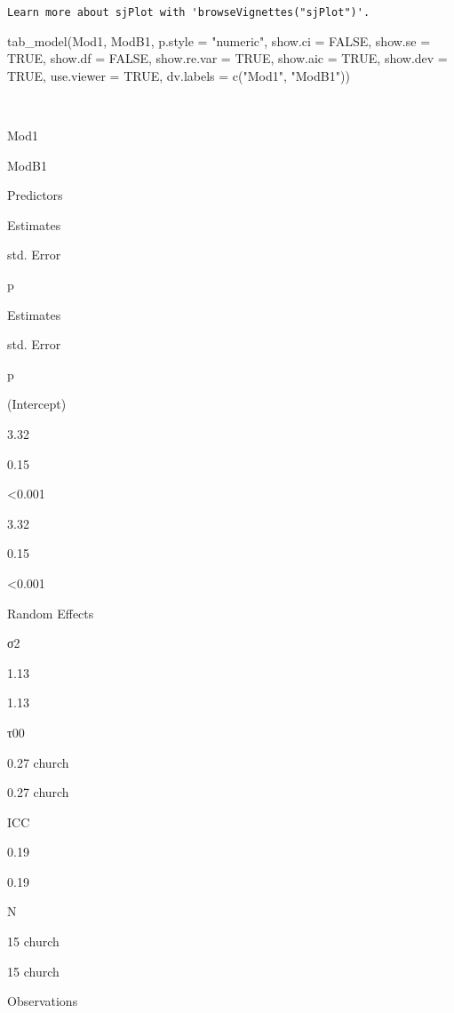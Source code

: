 \documentclass[
  11pt,
]{book}
\newenvironment{Shaded}{\begin{snugshade}}{\end{snugshade}}
\newcommand{\AttributeTok}[1]{\textcolor[rgb]{0.77,0.63,0.00}{#1}}
\newcommand{\ConstantTok}[1]{\textcolor[rgb]{0.00,0.00,0.00}{#1}}
\newcommand{\FunctionTok}[1]{\textcolor[rgb]{0.00,0.00,0.00}{#1}}
\newcommand{\NormalTok}[1]{#1}
\newcommand{\StringTok}[1]{\textcolor[rgb]{0.31,0.60,0.02}{#1}}
\begin{document}
\begin{verbatim}
Learn more about sjPlot with 'browseVignettes("sjPlot")'.
\end{verbatim}

\begin{Shaded}
\begin{Highlighting}[]
\FunctionTok{tab\_model}\NormalTok{(Mod1, ModB1, }\AttributeTok{p.style =} \StringTok{"numeric"}\NormalTok{, }\AttributeTok{show.ci =} \ConstantTok{FALSE}\NormalTok{, }\AttributeTok{show.se =} \ConstantTok{TRUE}\NormalTok{, }\AttributeTok{show.df =} \ConstantTok{FALSE}\NormalTok{, }\AttributeTok{show.re.var =} \ConstantTok{TRUE}\NormalTok{, }\AttributeTok{show.aic =} \ConstantTok{TRUE}\NormalTok{, }\AttributeTok{show.dev =} \ConstantTok{TRUE}\NormalTok{, }\AttributeTok{use.viewer =} \ConstantTok{TRUE}\NormalTok{, }\AttributeTok{dv.labels =} \FunctionTok{c}\NormalTok{(}\StringTok{"Mod1"}\NormalTok{, }\StringTok{"ModB1"}\NormalTok{))}
\end{Highlighting}
\end{Shaded}

~

Mod1

ModB1

Predictors

Estimates

std. Error

p

Estimates

std. Error

p

(Intercept)

3.32

0.15

\textless0.001

3.32

0.15

\textless0.001

Random Effects

σ2

1.13

1.13

τ00

0.27 church

0.27 church

ICC

0.19

0.19

N

15 church

15 church

Observations
\end{document}
